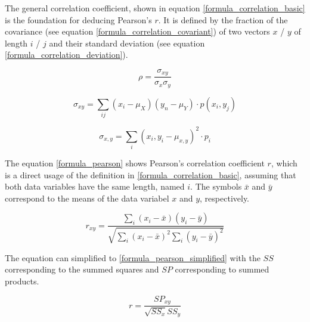 \documentclass[a4paper,12pt]{report}
\begin{document}
The general correlation coefficient, shown in equation \ref{formula_correlation_basic} is the foundation for deducing Pearson's $r$. It is defined by the fraction of the covariance (see equation \ref{formula_correlation_covariant}) of two vectors $x$ / $y$ of length $i$ / $j$ and their standard deviation (see equation \ref{formula_correlation_deviation}).\cite{HerzSchlicherSiegener1992}

\smallskip

\begin{equation}
\label{formula_correlation_basic}
	\rho = \frac{\sigma_{xy}}{\sigma_{x}\sigma_{y}}
\end{equation}

\begin{equation}
\label{formula_correlation_covariant}
	\sigma_{xy} = \sum_{ij}(x_i-\mu_X)(y_n-\mu_Y) \cdot p(x_i,y_j)
\end{equation}

\begin{equation}
\label{formula_correlation_deviation}
	\sigma_{x,y} = \sum_{i}(x_i,y_i-\mu_{x,y})^2 \cdot p_i
\end{equation}

\bigskip

The equation \ref{formula_pearson} shows Pearson's correlation coefficient $r$, which is a direct usage of the definition in \ref{formula_correlation_basic}, assuming that both data variables have the same length, named $i$. The symbols $\bar{x}$ and $\bar{y}$ correspond to the means of the data variabel $x$ and $y$, respectively. \cite{BenestyChenHuang2009,Zychlinski2018}

\smallskip

\begin{equation}
\label{formula_pearson}	
	r_{xy} =  \frac{\sum_{i}{(x_i-\bar{x})(y_i-\bar{y})}}{\sqrt{\sum_{i}{(x_i-\bar{x})^2}\sum_{i}{(y_i-\bar{y})^2}}}
\end{equation}

\bigskip

The equation can simplified to \ref{formula_pearson_simplified} with the $SS$ corresponding to the summed squares and $SP$ corresponding to summed products.

\smallskip

\begin{equation}
\label{formula_pearson_simplified}
	r =  \frac{SP_{xy}}{\sqrt{SS_x}{SS_y}}
\end{equation}
\end{document}
